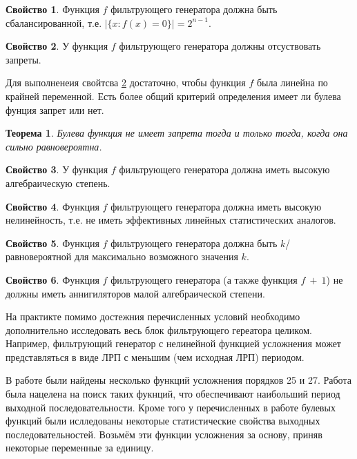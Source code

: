 \documentclass[a4paper,12pt]{article}
\newtheorem{theorem}{Теорема}[section]
\theoremstyle{definition}
\newtheorem{property}{Свойство}[subsection]
\begin{document}
	
	\begin{property}
		Функция $f$ фильтрующего генератора должна быть сбалансированной, т.е.  $|\{x : f(x) = 0\}| = 2^{n-1} $.  
	\end{property}

	\begin{property} \label{prop::zapr}
		У функция $f$ фильтрующего генератора должны отсуствовать запреты. 
	\end{property}

	Для выполненеия свойтсва \ref{prop::zapr} достаточно, чтобы функция $f$ была линейна по крайней переменной. Есть более общий критерий определения имеет ли булева фунция запрет или нет.
	
	\begin{theorem}
		Булева функция не имеет запрета тогда и только тогда, когда она сильно равновероятна.

	\end{theorem}

	\begin{property} 
		У функция $f$ фильтрующего генератора должна иметь высокую алгебраическую степень.
	\end{property}

	\begin{property} 
		Функция $f$ фильтрующего генератора должна иметь высокую нелинейность, т.е. не иметь эффективных линейных статистических аналогов.
	\end{property}

	\begin{property} 
		Функция $f$ фильтрующего генератора должна быть $k$\-/равновероятной для максимально возможного значения $k$.
	\end{property}
	
	\begin{property} 
		Функция $f$ фильтрующего генератора (а также функция $f~+~1$) не должны иметь аннигиляторов малой алгебраической степени.
	\end{property}
	
	
	На практикте помимо достежния перечисленных условий необходимо дополнительно исследовать весь блок фильтрующего гереатора целиком.
	Например, фильтрующий генератор с нелинейной функцией усложнения может представляться в виде ЛРП с меньшим (чем исходная ЛРП) периодом.
	
	В работе \textcite{rachwalik2012generation} были найдены несколько функций усложнения порядков 25 и 27. Работа была нацелена на поиск таких фукнций, что обеспечивают наибольший период выходной последовательности. Кроме того у перечисленных в работе булевых функций были ислледованы некоторые статистические свойства выходных последовательностей. Возьмём эти функции усложнения за основу, приняв некоторые переменные за единицу.
	
\end{document}
